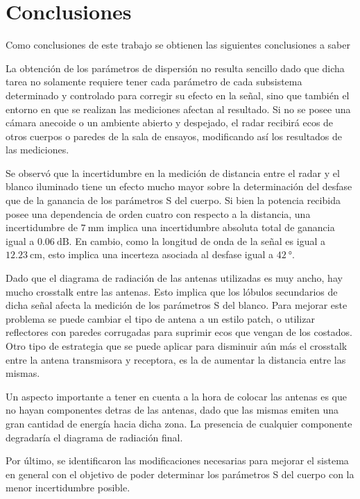 \chapter{Conclusiones} \label{ch:conclusions}

\ifpdf
    \graphicspath{{Chapter6/Figs/Raster/}{Chapter6/Figs/PDF/}{Chapter6/Figs/}}
\else
    \graphicspath{{Chapter6/Figs/Vector/}{Chapter6/Figs/}}
\fi

Como conclusiones de este trabajo se obtienen las siguientes conclusiones a saber

La obtención de los parámetros de dispersión no resulta sencillo dado que dicha tarea no solamente requiere tener cada parámetro de cada subsistema determinado y controlado para corregir su efecto en la señal, sino que también el entorno en que se realizan las mediciones afectan al resultado. Si no se posee una cámara anecoide o un ambiente abierto y despejado, el radar recibirá ecos de otros cuerpos o paredes de la sala de ensayos, modificando así los resultados de las mediciones.

Se observó que la incertidumbre en la medición de distancia entre el radar y el blanco iluminado tiene un efecto mucho mayor sobre la determinación del desfase que de la ganancia de los parámetros S del cuerpo. Si bien la potencia recibida posee una dependencia de orden cuatro con respecto a la distancia, una incertidumbre de $\SI{7}{\milli\meter}$ implica una incertidumbre absoluta total de ganancia igual a $\SI{0.06}{\dB}$. En cambio, como la longitud de onda de la señal es igual a $\SI{12.23}{\centi\meter}$, esto implica una incerteza asociada al desfase igual a $\SI{42}{\degree}$.

Dado que el diagrama de radiación de las antenas utilizadas es muy ancho, hay mucho crosstalk entre las antenas. Esto implica que los lóbulos secundarios de dicha señal afecta la medición de los parámetros S del blanco. Para mejorar este problema se puede cambiar el tipo de antena a un estilo patch, o utilizar reflectores con paredes corrugadas para suprimir ecos que vengan de los costados. Otro tipo de estrategia que se puede aplicar para disminuir aún más el crosstalk entre la antena transmisora y receptora, es la de aumentar la distancia entre las mismas.

Un aspecto importante a tener en cuenta a la hora de colocar las antenas es que no hayan componentes detras de las antenas, dado que las mismas emiten una gran cantidad de energía hacia dicha zona. La presencia de cualquier componente degradaría el diagrama de radiación final.

Por último, se identificaron las modificaciones necesarias para mejorar el sistema en general con el objetivo de poder determinar los parámetros S del cuerpo con la menor incertidumbre posible.
